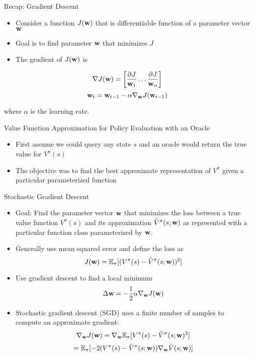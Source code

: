 \documentclass[aspectratio=169]{../latex_main/tntbeamer}  %
\begin{document}
\begin{frame}[c]{Recap: Gradient Descent}
	
	
	\begin{itemize}
		\item Consider a function $J(\mathbf{w})$ that is differentiable function of a parameter vector $\mathbf{w}$
		\item Goal is to find parameter $\mathbf{w}$ that minimizes $J$
		\item The gradient of $J(\mathbf{w})$ is
	\end{itemize}
	$$
	\nabla J(\mathbf{w}) = \left[ \frac{\partial J}{\mathbf{w}_1} \ldots \frac{\partial J}{\mathbf{w}_n} \right]
	$$
	$$\mathbf{w}_t = \mathbf{w}_{t-1} - \alpha \nabla_{\mathbf{w}} J(\mathbf{w}_{t-1})$$
	
	where $\alpha$ is the learning rate.

	
\end{frame}
\begin{frame}[c]{Value Function Approximation for Policy Evaluation with
		an Oracle}
	
	
	\begin{itemize}
		\item First assume we could query any state $s$ and an \alert{oracle} would return
		the true value for $V^\pi (s)$
		\item The objective was to find the best approximate representation of $V^\pi$
		given a particular parameterized function
	\end{itemize}
	
\end{frame}
\begin{frame}[c]{Stochastic Gradient Descent}
	
	
	\begin{itemize}
		\item Goal: Find the parameter vector $\mathbf{w}$ that minimizes the loss between a
		true value function $V^{\pi}(s)$ and its approximation $\hat{V}^\pi(s; \mathbf{w})$ as
		represented with a particular function class parameterized by $\mathbf{w}$.
		\item Generally use mean squared error and define the loss as 
		$$ J(\mathbf{w}) = \mathbb{E}_{\pi} [(V^\pi(s) - \hat{V}^\pi(s;\mathbf{w}))^2]$$
		\item Use gradient descent to find a local minimum 
		$$ \Delta \mathbf{w} = - \frac{1}{2} \alpha \nabla_{\mathbf{w}} J(\mathbf{w})$$
		\item Stochastic gradient descent (SGD) uses a finite number of samples to compute an approximate gradient:
		$$ \nabla_{\mathbf{w}} J(\mathbf{w}) = \nabla_{\mathbf{w}} \mathbb{E}_{\pi}[V^\pi (s) - \hat{V}^\pi (s; \mathbf{w})^2]$$
		$$= \mathbb{E}_\pi [-2 (V^\pi(s) - \hat{V}^\pi (s;\mathbf{w})) \nabla_{\mathbf{w}} \hat{V}(s;\mathbf{w})]$$
	\end{itemize}
	
\end{frame}
\end{document}
